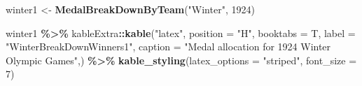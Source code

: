 \documentclass[
]{article}
\newenvironment{Shaded}{\begin{snugshade}}{\end{snugshade}}
\newcommand{\AttributeTok}[1]{\textcolor[rgb]{0.13,0.29,0.53}{#1}}
\newcommand{\DecValTok}[1]{\textcolor[rgb]{0.00,0.00,0.81}{#1}}
\newcommand{\FunctionTok}[1]{\textcolor[rgb]{0.13,0.29,0.53}{\textbf{#1}}}
\newcommand{\NormalTok}[1]{#1}
\newcommand{\OtherTok}[1]{\textcolor[rgb]{0.56,0.35,0.01}{#1}}
\newcommand{\SpecialCharTok}[1]{\textcolor[rgb]{0.81,0.36,0.00}{\textbf{#1}}}
\newcommand{\StringTok}[1]{\textcolor[rgb]{0.31,0.60,0.02}{#1}}
\begin{document}
\newpage

\begin{Shaded}
\begin{Highlighting}[]
\NormalTok{winter1 }\OtherTok{\textless{}{-}} \FunctionTok{MedalBreakDownByTeam}\NormalTok{(}\StringTok{"Winter"}\NormalTok{, }\DecValTok{1924}\NormalTok{)}

\NormalTok{winter1 }\SpecialCharTok{\%\textgreater{}\%} 
\NormalTok{  kableExtra}\SpecialCharTok{::}\FunctionTok{kable}\NormalTok{(}\StringTok{"latex"}\NormalTok{, }\AttributeTok{position =} \StringTok{"H"}\NormalTok{,  }\AttributeTok{booktabs =}\NormalTok{ T,}
         \AttributeTok{label =} \StringTok{"WinterBreakDownWinners1"}\NormalTok{,}
         \AttributeTok{caption =} \StringTok{"Medal allocation for 1924 Winter Olympic Games"}\NormalTok{,) }\SpecialCharTok{\%\textgreater{}\%} 
         \FunctionTok{kable\_styling}\NormalTok{(}\AttributeTok{latex\_options =} \StringTok{"striped"}\NormalTok{, }\AttributeTok{font\_size =} \DecValTok{7}\NormalTok{)}
\end{Highlighting}
\end{Shaded}
\end{document}

